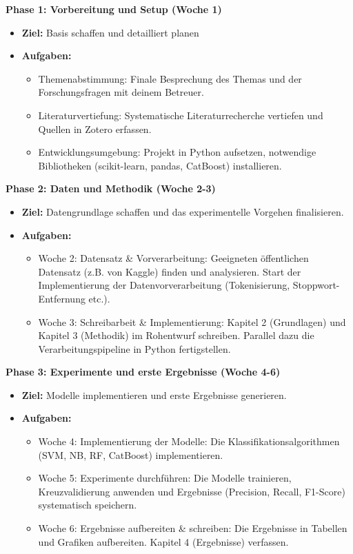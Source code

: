\textbf{Phase 1: Vorbereitung und Setup (Woche 1)}
\begin{itemize}[leftmargin=*, noitemsep]
	\item\textbf{Ziel:} Basis schaffen und detailliert planen
	\item\textbf{Aufgaben:}
	      \begin{itemize}[noitemsep]
		      \item Themenabstimmung: Finale Besprechung des Themas und der Forschungsfragen  mit deinem Betreuer.
		      \item Literaturvertiefung: Systematische Literaturrecherche vertiefen und Quellen in Zotero erfassen.
		      \item Entwicklungsumgebung: Projekt in Python aufsetzen, notwendige Bibliotheken (scikit-learn, pandas, CatBoost) installieren.
	      \end{itemize}
\end{itemize}

\textbf{Phase 2: Daten und Methodik (Woche 2-3)}
\begin{itemize}[leftmargin=*, noitemsep]
	\item\textbf{Ziel:} Datengrundlage schaffen und das experimentelle Vorgehen finalisieren.
	\item\textbf{Aufgaben:}
	      \begin{itemize}[noitemsep]
		      \item Woche 2: Datensatz \& Vorverarbeitung: Geeigneten öffentlichen Datensatz (z.B. von Kaggle) finden und analysieren. Start der Implementierung der Datenvorverarbeitung (Tokenisierung, Stoppwort-Entfernung etc.).
		      \item Woche 3: Schreibarbeit \& Implementierung: Kapitel 2 (Grundlagen) und Kapitel 3 (Methodik) im Rohentwurf schreiben.  Parallel dazu die Verarbeitungspipeline in Python fertigstellen.
	      \end{itemize}
\end{itemize}

\textbf{Phase 3: Experimente und erste Ergebnisse (Woche 4-6)}
\begin{itemize}[leftmargin=*, noitemsep]
	\item\textbf{Ziel:} Modelle implementieren und erste Ergebnisse generieren.
	\item\textbf{Aufgaben:}
	      \begin{itemize}[noitemsep]
		      \item Woche 4: Implementierung der Modelle: Die Klassifikationsalgorithmen (SVM, NB, RF, CatBoost) implementieren.
		      \item Woche 5: Experimente durchführen: Die Modelle trainieren, Kreuzvalidierung anwenden und Ergebnisse (Precision, Recall, F1-Score) systematisch speichern.
		      \item Woche 6: Ergebnisse aufbereiten \& schreiben: Die Ergebnisse in Tabellen und Grafiken aufbereiten. Kapitel 4 (Ergebnisse) verfassen.
	      \end{itemize}
\end{itemize}

